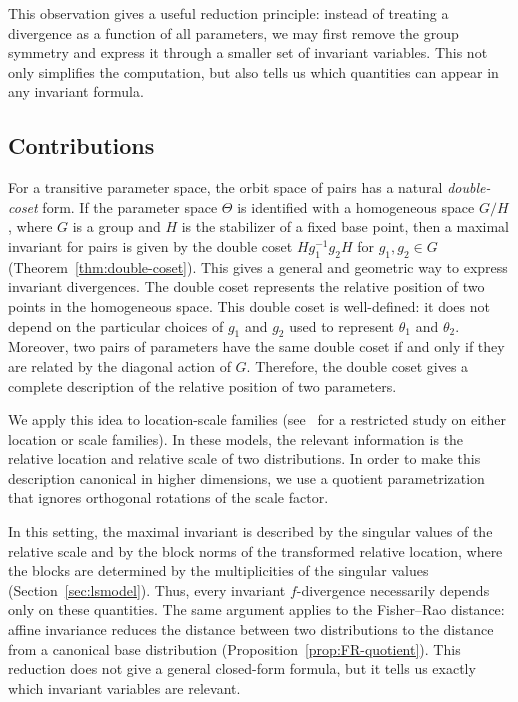 \documentclass[a4paper, reqno, 11pt]{article}
\theoremstyle{definition}
\begin{document}
This observation gives a useful reduction principle: instead of treating a divergence as a function of all parameters, we may first remove the group symmetry and express it through a smaller set of invariant variables. 
This not only simplifies the computation, but also tells us which quantities can appear in any invariant formula. 

\subsection{Contributions}

For a transitive parameter space, the orbit space of pairs has a natural {\it double-coset} form. 
If the parameter space $\Theta$ is identified with a homogeneous space $G/H$, where $G$ is a group and $H$ is the stabilizer of a fixed base point, then a maximal invariant for pairs is given by the double coset $H g_1^{-1} g_2 H$ for $g_1, g_2 \in G$ (Theorem~\ref{thm:double-coset}). 
This gives a general and geometric way to express invariant divergences. 
The double coset represents the relative position of two points in the homogeneous space. 
This double coset is well-defined: it does not depend on the particular choices of $g_1$ and $g_2$ used to represent $\theta_1$ and $\theta_2$. 
Moreover, two pairs of parameters have the same double coset if and only if they are related by the diagonal action of $G$. 
Therefore, the double coset gives a complete description of the relative position of two parameters.

We apply this idea to location-scale families (see~\cite{NO2024} for a restricted study on either location or scale families). 
In these models, the relevant information is the relative location and relative scale of two distributions. 
In order to make this description canonical in higher dimensions, we use a quotient parametrization that ignores orthogonal rotations of the scale factor.

In this setting, the maximal invariant is described by the singular values of the relative scale and by the block norms of the transformed relative location, where the blocks are determined by the multiplicities of the singular values (Section~\ref{sec:lsmodel}).  
Thus, every invariant $f$-divergence necessarily depends only on these quantities. The same argument applies to the Fisher--Rao distance: affine invariance reduces the distance between two distributions to the distance from a canonical base distribution (Proposition~\ref{prop:FR-quotient}). 
This reduction does not give a general closed-form formula, but it tells us exactly which invariant variables are relevant. 
\end{document}
